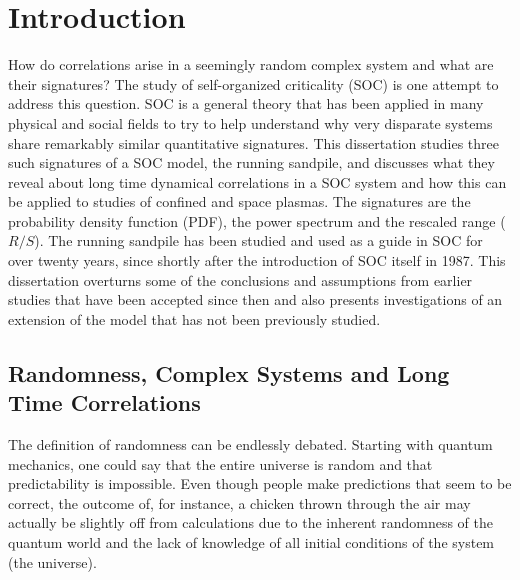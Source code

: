 \chapter{Introduction}
\label{sec:intro_introduction}

How do correlations arise in a seemingly random complex system and
what are their signatures?  The study of self-organized criticality
(SOC) is one attempt to address this question.  SOC is a general
theory that has been applied in many physical and social fields to try
to help understand why very disparate systems share remarkably similar
quantitative signatures.  This dissertation studies three such
signatures of a SOC model, the running sandpile, and discusses what
they reveal about long time dynamical correlations in a SOC system and
how this can be applied to studies of confined and space plasmas.  The
signatures are the probability density function (PDF), the power
spectrum and the rescaled range ($R/S$).  The running sandpile has
been studied and used as a guide in SOC for over twenty years, since
shortly after the introduction of SOC itself in 1987.  This
dissertation overturns some of the conclusions and assumptions from
earlier studies that have been accepted since then and also presents
investigations of an extension of the model that has not been
previously studied.

\section{Randomness, Complex Systems and Long Time Correlations}
\label{sec:intro_rand-compl-syst}

The definition of randomness can be endlessly debated.  Starting with
quantum mechanics, one could say that the entire universe is random
and that predictability is impossible.  Even though people make
predictions that seem to be correct, the outcome of, for instance, a
chicken thrown through the air may actually be slightly off from
calculations due to the inherent randomness of the quantum world and
the lack of knowledge of all initial conditions of the system (the
universe).

%
%
